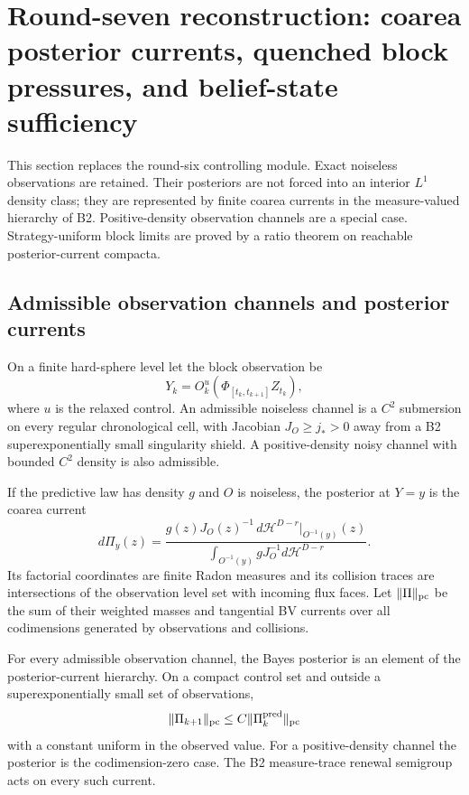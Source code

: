 \section{Round-seven reconstruction: coarea posterior currents, quenched block pressures, and belief-state sufficiency}
\label{sec:r7-c1}

This section replaces the round-six controlling module.  Exact noiseless
observations are retained.  Their posteriors are not forced into an interior
$L^1$ density class; they are represented by finite coarea currents in the
measure-valued hierarchy of B2.  Positive-density observation channels are a
special case.  Strategy-uniform block limits are proved by a ratio theorem on
reachable posterior-current compacta.

\subsection{Admissible observation channels and posterior currents}

On a finite hard-sphere level let the block observation be
\[
 Y_k=O_k^u(\Phi_{[t_k,t_{k+1}]}Z_{t_k}),
\]
where $u$ is the relaxed control.  An admissible noiseless channel is a
$C^2$ submersion on every regular chronological cell, with Jacobian
$J_O\ge j_*>0$ away from a B2 superexponentially small singularity shield.
A positive-density noisy channel with bounded $C^2$ density is also admissible.

If the predictive law has density $g$ and $O$ is noiseless, the posterior at
$Y=y$ is the coarea current
\[
 d\Pi_y(z)=
 \frac{g(z)J_O(z)^{-1}
       \,d\mathcal H^{D-r}|_{O^{-1}(y)}(z)}
      {\int_{O^{-1}(y)}gJ_O^{-1}d\mathcal H^{D-r}}.
\]
Its factorial coordinates are finite Radon measures and its collision traces
are intersections of the observation level set with incoming flux faces.
Let $\|\Pi\|_{\rm pc}$ be the sum of their weighted masses and tangential BV
currents over all codimensions generated by observations and collisions.

\begin{lemma}
\label{lem:r7-c1-coarea}
For every admissible observation channel, the Bayes posterior is an element of
the posterior-current hierarchy.  On a compact control set and outside a
superexponentially small set of observations,
\[
 \|\Pi_{k+1}\|_{\rm pc}
 \le C\|\Pi_{k}^{\rm pred}\|_{\rm pc}
\]
with a constant uniform in the observed value.  For a positive-density channel
the posterior is the codimension-zero case.  The B2 measure-trace renewal
semigroup acts on every such current.
\end{lemma}

